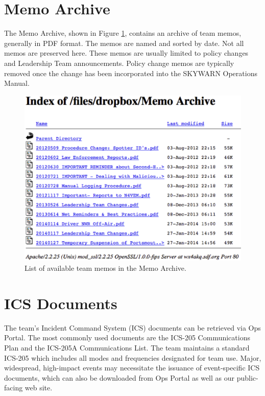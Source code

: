 \documentclass[pdflatex,letterpaper,twoside,12pt]{book}
\begin{document}

\section{Memo Archive}

The Memo Archive, shown in Figure \ref{fig:ops-memo-list}, contains an archive of team memos, generally in PDF format.  The memos are named and sorted by date.  Not all memos are preserved here.  These memos are usually limited to policy changes and Leadership Team announcements.  Policy change memos are typically removed once the change has been incorporated into the SKYWARN Operations Manual.

\begin{figure}[h]
  \centering
  \includegraphics[width=\textwidth,keepaspectratio=true]{img/ops-memo-list-cropped}
  \caption{List of available team memos in the Memo Archive.\label{fig:ops-memo-list}}
\end{figure}


\section{ICS Documents}

The team's Incident Command System (ICS) documents can be retrieved via Ops Portal.  The most commonly used documents are the ICS-205 Communications Plan and the ICS-205A Communications List.  The team maintains a standard ICS-205 which includes all modes and frequencies designated for team use.  Major, widespread, high-impact events may necessitate the issuance of event-specific ICS documents, which can also be downloaded from Ops Portal as well as our public-facing web site.
\end{document}
